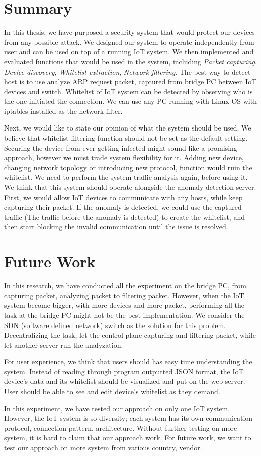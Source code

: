 \section{Summary}
In this thesis, we have purposed a security system that would protect our devices from any possible attack. We designed our system to operate independently from user and can be used on top of a running IoT system. We then implemented and evaluated functions that would be used in the system, including \textit{Packet capturing}, \textit{Device discovery}, \textit{Whitelist extraction}, \textit{Network filtering}. The best way to detect host is to use analyze ARP request packet, captured from bridge PC between IoT devices and switch. Whitelist of IoT system can be detected by observing who is the one initiated the connection. We can use any PC running with Linux OS with iptables installed as the network filter.  

Next, we would like to state our opinion of what the system should be used. We believe that whitelist filtering function should not be set as the default setting. Securing the device from ever getting infected might sound like a promising approach, however we must trade system flexibility for it. Adding new device, changing network topology or introducing new protocol, function would ruin the whitelist. We need to perform the system traffic analysis again, before using it. We think that this system should operate alongside the anomaly detection server. First, we would allow IoT devices to communicate with any hosts, while keep capturing their packet. If the anomaly is detected, we could use the captured traffic (The traffic before the anomaly is detected) to create the whitelist, and then start blocking the invalid communication until the issue is resolved.  


\section{Future Work}
In this research, we have conducted all the experiment on the bridge PC, from capturing packet, analyzing packet to filtering packet. However, when the IoT system become bigger, with more devices and more packet, performing all the task at the bridge PC might not be the best implementation. We consider the SDN (software defined network) switch as the solution for this problem. Decentralizing the task, let the control plane capturing and filtering packet, while let another server run the analyzation.  

For user experience, we think that users should has easy time understanding the system. Instead of reading through program outputted JSON format, the IoT device’s data and its whitelist should be visualized and put on the web server. User should be able to see and edit device’s whitelist as they demand.  

In this experiment, we have tested our approach on only one IoT system. However, the IoT system is so diversity; each system has its own communication protocol, connection pattern, architecture. Without further testing on more system, it is hard to claim that our approach work. For future work, we want to test our approach on more system from various country, vendor.  